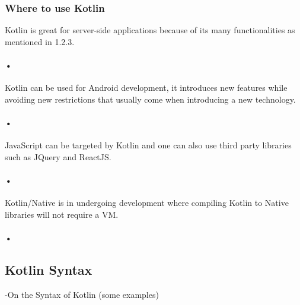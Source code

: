 \subsubsection{Where to use Kotlin}
Kotlin is great for server-side applications because of its many functionalities as mentioned in 1.2.3. \paragraph{•}
Kotlin can be used for Android development, it introduces new features while avoiding new restrictions that usually come when introducing a new technology. \paragraph{•}
JavaScript can be targeted by Kotlin and one can also use third party libraries such as JQuery and ReactJS. \paragraph{•}
Kotlin/Native is in undergoing development where compiling Kotlin to Native libraries will not require a VM. \paragraph{•}


\subsection{Kotlin Syntax}
 -On the Syntax of Kotlin (some examples)
 



